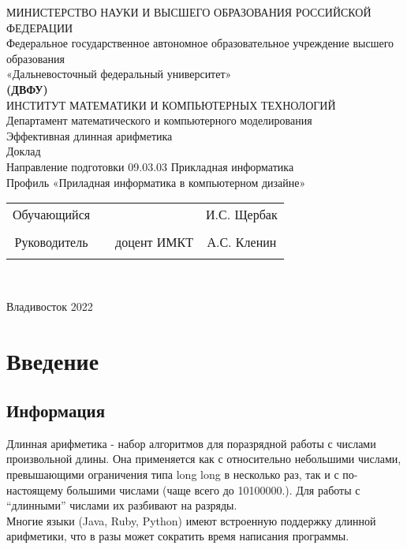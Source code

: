 \documentclass[a4paper]{article}
\begin{document}
 
 
\begin{center}
\hfill \break
\large{МИНИСТЕРСТВО НАУКИ И ВЫСШЕГО ОБРАЗОВАНИЯ РОССИЙСКОЙ ФЕДЕРАЦИИ}\\
\footnotesize{Федеральное государственное автономное образовательное учреждение высшего образования}\\ 
\footnotesize{«Дальневосточный федеральный университет»}\\
\small{\textbf{(ДВФУ)}}\\
\hfill \break
\normalsize{ИНСТИТУТ МАТЕМАТИКИ И КОМПЬЮТЕРНЫХ ТЕХНОЛОГИЙ}\\
 \hfill \break
\normalsize{Департамент математического и компьютерного моделирования}\\
\hfill\break
\hfill \break
\hfill \break
\hfill \break
\large{Эффективная длинная арифметика}\\
\hfill \break
\hfill \break
\hfill \break
\normalsize{Доклад\\
\hfill \break
Направление подготовки 09.03.03 Прикладная информатика\\
\hfill \break
Профиль «Приладная информатика в компьютерном дизайне»}\\
\hfill \break
\hfill \break
\end{center}
 
\normalsize{} \hfill \break
\hfill \break
 
\normalsize{ 
\begin{tabular}{cccc}
Обучающийся & \underline{\hspace{3cm}} & &И.С. Щербак \\\\
Руководитель & \underline{\hspace{3cm}}& доцент ИМКТ &А.С. Кленин \\\\
\end{tabular}
}\\
\hfill \break
\hfill \break
\begin{center} Владивосток 2022 \end{center}
\thispagestyle{empty} 
 
\newpage
     
    \tableofcontents 
\newpage

\section{Введение}
\subsection{Информация}
Длинная арифметика - набор алгоритмов для поразрядной работы с числами произвольной длины. Она применяется как с относительно небольшими числами, превышающими ограничения типа long long в несколько раз, так и с по-настоящему большими числами (чаще всего до 10100000.). Для работы с “длинными” числами их разбивают на разряды.
\\Многие языки (Java, Ruby, Python) имеют встроенную поддержку длинной арифметики, что в разы может сократить время написания программы.
\end{document}
